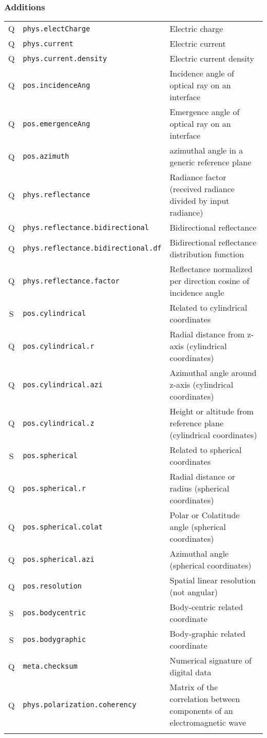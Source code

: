 \documentclass[11pt,a4paper]{ivoa}
\begin{document}
\subsubsection*{Additions}
\footnotesize\begin{longtable}[h!]{c|p{40ex}|p{}}
\sptablerule
Q & {\tt phys.electCharge} & Electric charge\\
Q & {\tt phys.current} & Electric current\\
Q & {\tt phys.current.density} & Electric current density\\
Q & {\tt pos.incidenceAng} & Incidence angle of optical ray on an interface\\
Q & {\tt pos.emergenceAng} & Emergence angle of optical ray on an interface\\
Q & {\tt pos.azimuth} & azimuthal angle in a generic reference plane\\
Q & {\tt phys.reflectance} & Radiance factor (received radiance divided by input radiance)\\
Q & {\tt phys.reflectance.bidirectional} & Bidirectional reflectance\\
Q & {\tt phys.reflectance.bidirectional.df} & Bidirectional reflectance distribution function\\
Q & {\tt phys.reflectance.factor} & Reflectance normalized per direction cosine of incidence angle\\
S & {\tt pos.cylindrical} & Related to cylindrical coordinates\\
Q & {\tt pos.cylindrical.r} & Radial distance from z-axis (cylindrical coordinates)\\
Q & {\tt pos.cylindrical.azi} & Azimuthal angle around z-axis (cylindrical coordinates)\\
Q & {\tt pos.cylindrical.z} & Height or altitude from reference plane (cylindrical coordinates)\\
S & {\tt pos.spherical} & Related to spherical coordinates\\
Q & {\tt pos.spherical.r} & Radial distance or radius (spherical coordinates)\\
Q & {\tt pos.spherical.colat} & Polar or Colatitude angle (spherical coordinates)\\
Q & {\tt pos.spherical.azi} & Azimuthal angle (spherical coordinates)\\
Q & {\tt pos.resolution} & Spatial linear resolution (not angular)\\
S & {\tt pos.bodycentric} & Body-centric related coordinate\\
S & {\tt pos.bodygraphic} & Body-graphic related coordinate\\
Q & {\tt meta.checksum} & Numerical signature of digital data\\
Q & {\tt phys.polarization.coherency} & Matrix of the correlation between components of an electromagnetic wave\\
\sptablerule
\end{longtable}
\end{document}
